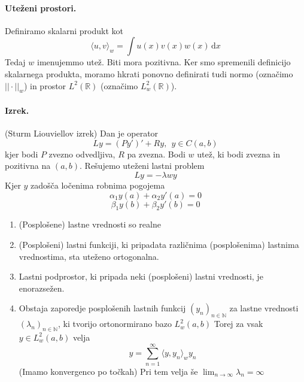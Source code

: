 \documentclass[a4paper]{article}
\newcommand{\dif}{\,\mathrm{d}}
\newcommand{\R}{\mathbb{R}}
\newcommand{\N}{\mathbb{N}}
\newcommand{\avg}[1]{\langle {#1} \rangle}
\newcommand{\Sum}[2][0]{\sum_{{#2} = {#1}}^{\infty}}
\begin{document}
\paragraph{Uteženi prostori.} Definiramo skalarni produkt kot
$$\avg{u, v}_w = \int u(x)v(x)w(x)\dif x$$
Tedaj $w$ imenujemmo utež. Biti mora pozitivna. Ker smo spremenili definicijo skalarnega produkta, moramo hkrati ponovno definirati tudi normo (označimo $||\cdot||_w$) in prostor $L^2(\R)$ (označimo $L_w^2(\R)$).
\paragraph{Izrek.} (Sturm Liouviellov izrek) Dan je operator $$Ly = (Py')' + Ry,~~y\in C(a, b)$$
kjer bodi $P$ zvezno odvedljiva, $R$ pa zvezna. Bodi $w$  utež, ki bodi zvezna in pozitivna na $(a, b)$.
Rešujemo uteženi lastni problem $$Ly = -\lambda w y$$
Kjer $y$ zadošča ločenima robnima pogojema
$$\alpha_1 y(a) + \alpha_2 y'(a) = 0$$
$$\beta_1 y(b) + \beta_2 y'(b) = 0$$
\begin{enumerate}
    \item (Posplošene) lastne vrednosti so realne
    \item (Posplošeni) lastni funkciji, ki pripadata različnima (posplošenima) lastnima vrednostima, sta uteženo ortogonalna.
    \item Lastni podprostor, ki pripada neki (posplošeni) lastni vrednosti, je enorazsežen.
    \item Obstaja zaporedje posplošenih lastnih funkcij $(y_n)_{n \in \N}$ za lastne vrednosti $(\lambda_n)_{n\in\N}$, ki tvorijo ortonormirano bazo $L_w^2(a, b)$
    Torej za vsak $y \in L^2_w(a, b)$ velja $$y = \Sum[1]{n}\avg{y, y_n}_w y_n$$ (Imamo konvergenco po točkah)
    Pri tem velja še $\lim_{n\to\infty}\lambda_n = \infty$
\end{enumerate}
\end{document}
